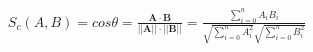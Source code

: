 \documentclass[10pt]{article}
\begin{document}
\begin{align*}S_c(A,B) = cos{\theta} = \frac{\mathbf{A} \cdot \mathbf{B}}{||\mathbf{A}|| \cdot ||\mathbf{B}||} = \frac{\sum\limits_{i=0}^n A_i B_i}{\sqrt{\sum\limits_{i=0}^n A_{i}^2} \sqrt{\sum\limits_{i=0}^n B_{i}^2}}\end{align*}
\end{document}
